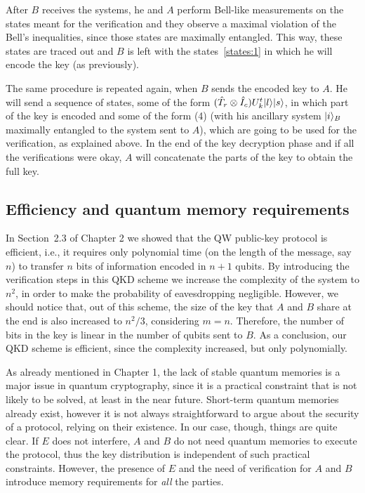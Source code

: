  After $B$ receives the systems, he and $A$ perform Bell-like measurements on the states meant for the verification and they observe a maximal violation of the Bell's inequalities, since those states are maximally entangled. This way, these states are traced out and $B$ is left with the states~\eqref{states:1} in which he will encode the key (as previously).
 
The same procedure is repeated again, when $B$ sends the encoded key to $A$. He will send a sequence of states, some of the form $(\hat{T}_r\otimes \hat{I}_c)U_k^t| l \rangle| s \rangle$, in which part of the key is encoded and some of the form (4) (with his ancillary system $| i \rangle_B$ maximally entangled to the system sent to $A$), which are going to be used for the verification, as explained above. In the end of the key decryption phase and if all the verifications were okay, $A$ will concatenate the parts of the key to obtain the full key.
 

\subsection{Efficiency and quantum memory requirements}
In Section~2.3 of Chapter 2 we showed that the QW public-key protocol is efficient, i.e., it requires only polynomial time (on the length of the message, say $n$) to transfer $n$ bits of information encoded in $n+1$ qubits. By introducing the verification steps in this QKD scheme we increase the complexity of the system to $n^2$, in order to make the probability of eavesdropping negligible. However, we should notice that, out of this scheme, the size of the key that $A$ and $B$ share at the end is also increased to $n^2/3$, considering $m=n$. Therefore, the number of bits in the key is linear in the number of qubits sent to $B$. As a conclusion, our QKD scheme is efficient, since the complexity increased, but only polynomially.

As already mentioned in Chapter 1, the lack of stable quantum memories is a major issue in quantum cryptography, since it is a practical constraint that is not likely to be solved, at least in the near future. Short-term quantum memories already exist, however it is not always straightforward to argue about the security of a protocol, relying on their existence. In our case, though, things are quite clear. If $E$ does not interfere, $A$ and $B$ do not need quantum memories to execute the protocol, thus the key distribution is independent of such practical constraints. However, the presence of $E$ and the need of verification for $A$ and $B$ introduce memory requirements for {\em all} the parties. 

